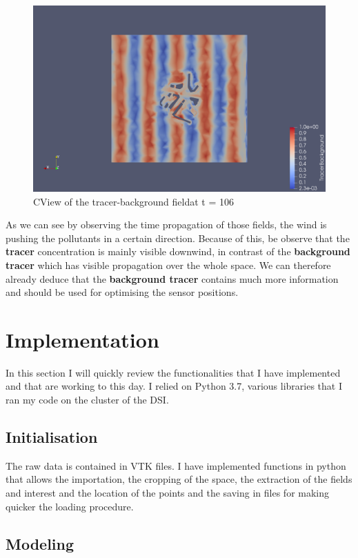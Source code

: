 \begin{figure}[h!]
\centering
  \includegraphics[width=0.8\linewidth]{figures/Tracer/tracerBackground_cut_z_106}
  \caption{CView of the tracer-background fieldat t = 106 }
  \label{fig:view:tracerBackground}
\end{figure}

As we can see by observing the time propagation of those fields,  the wind is pushing the pollutants in a certain direction. Because of this, be observe that the \textbf{tracer} concentration is mainly visible downwind, in contrast of the \textbf{background tracer} which has visible propagation over the whole space. We can therefore already deduce that the \textbf{background tracer} contains much more information and should be used for optimising the sensor positions. 


\section{Implementation}

In this section I will quickly review the functionalities that I have implemented and that are working to this day. I relied on Python 3.7, various libraries that I ran my code on the cluster of the DSI.  \\

\subsection{Initialisation}
The raw data is contained in VTK files. I have implemented functions in python that allows the importation, the cropping of the space, the extraction of the fields and interest and the location of the points and the saving in files for making quicker the loading procedure. 

\subsection{Modeling}

